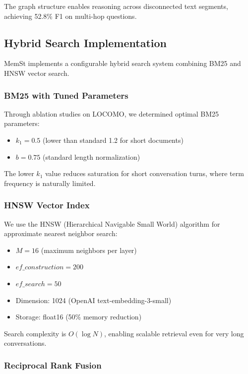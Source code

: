 The graph structure enables reasoning across disconnected text segments, achieving 52.8\% F1 on multi-hop questions.

\subsection{Hybrid Search Implementation}

MemSt implements a configurable hybrid search system combining BM25 and HNSW vector search.

\subsubsection{BM25 with Tuned Parameters}

Through ablation studies on LOCOMO, we determined optimal BM25 parameters:
\begin{itemize}
    \item $k_1 = 0.5$ (lower than standard 1.2 for short documents)
    \item $b = 0.75$ (standard length normalization)
\end{itemize}

The lower $k_1$ value reduces saturation for short conversation turns, where term frequency is naturally limited.

\subsubsection{HNSW Vector Index}

We use the HNSW (Hierarchical Navigable Small World) algorithm for approximate nearest neighbor search:
\begin{itemize}
    \item $M = 16$ (maximum neighbors per layer)
    \item $ef\_construction = 200$
    \item $ef\_search = 50$
    \item Dimension: 1024 (OpenAI text-embedding-3-small)
    \item Storage: float16 (50\% memory reduction)
\end{itemize}

Search complexity is $O(\log N)$, enabling scalable retrieval even for very long conversations.

\subsubsection{Reciprocal Rank Fusion}

